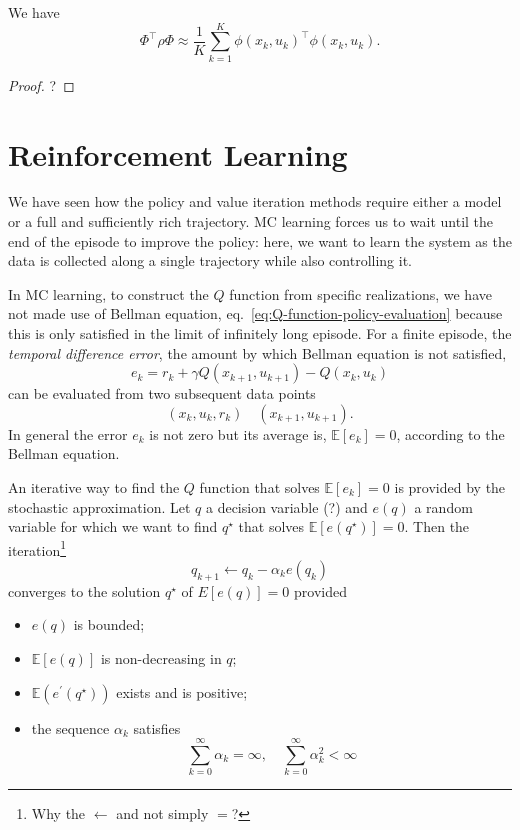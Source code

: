 \begin{theorem}
  We have
  \begin{equation*}
    \Phi^\top\rho\Phi \approx \frac{1}{K} \sum_{k=1}^K \phi(x_k,u_k)^\top\phi(x_k,u_k).
  \end{equation*}
\end{theorem}
\begin{proof}
  ?
\end{proof}

\section{Reinforcement Learning}
\label{sec:r-learning}

We have seen how the policy and value iteration methods require either a model or a full and sufficiently rich trajectory. MC learning forces us to wait until the end of the episode to improve the policy: here, we want to learn the system as the data is collected along a single trajectory while also controlling it.

In MC learning, to construct the $Q$ function from specific realizations, we have not made use of Bellman equation, eq.~\eqref{eq:Q-function-policy-evaluation} because this is only satisfied in the limit of infinitely long episode. For a finite episode, the \emph{temporal difference error}, the amount by which Bellman equation is not satisfied,
\begin{equation}
  \label{eq:TD-error}
  e_k = r_k + \gamma Q(x_{k+1},u_{k+1}) - Q(x_k,u_k)
\end{equation}
can be evaluated from two subsequent data points
\begin{equation*}
  (x_k,u_k,r_k)\quad (x_{k+1},u_{k+1}).
\end{equation*}
In general the error $e_k$ is not zero but its average is, $\mathbb{E}[e_k] = 0$, according to the Bellman equation.

An iterative way to find the $Q$ function that solves $\mathbb{E}[e_k] = 0$ is provided by the stochastic approximation. Let $q$ a decision variable (?) and $e(q)$ a random variable for which we want to find $q^\star$ that solves $\mathbb{E}[e(q^\star)]=0$. Then the iteration\footnote{Why the $\leftarrow$ and not simply $=$?}
\begin{equation}
  \label{eq:TD-error-iterative-solution}
  q_{k+1} \leftarrow q_k -\alpha_k e(q_k)
\end{equation}
converges to the solution $q^\star$ of $E[e(q)]=0$ provided
\begin{itemize}
\item $e(q)$ is bounded;
\item $\mathbb{E}[e(q)]$ is non-decreasing in $q$;
\item $\mathbb{E}(e^\prime(q^\star))$ exists and is positive;
\item the sequence $\alpha_k$ satisfies
  \begin{equation*}
    \sum_{k=0}^\infty \alpha_k = \infty, \quad \sum_{k=0}^\infty \alpha_k^2 < \infty
  \end{equation*}
\end{itemize}

